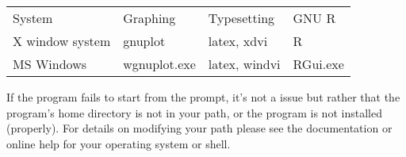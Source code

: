 \begin{center}
\begin{tabular}{llll}
System & Graphing & Typesetting & GNU R\\
X window system & gnuplot & latex, xdvi & R\\
MS Windows & wgnuplot.exe & latex, windvi & RGui.exe\\
\end{tabular}
\end{center}


      If the program fails to start from the prompt, it's not a
       issue but rather that the
      program's home directory is not in your path, or the program is
      not installed (properly).  For details on modifying your path
      please see the documentation or online help for your operating
      system or shell.
    

